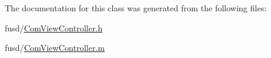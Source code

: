 \-The documentation for this class was generated from the following files\-:\begin{DoxyCompactItemize}
\item 
fusd/\hyperlink{_com_view_controller_8h}{\-Com\-View\-Controller.\-h}\item 
fusd/\hyperlink{_com_view_controller_8m}{\-Com\-View\-Controller.\-m}\end{DoxyCompactItemize}
